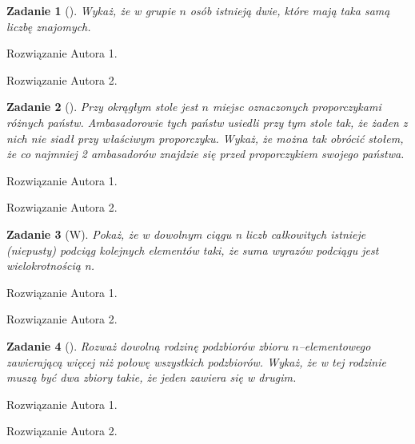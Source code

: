 \documentclass{mwart}
\newtheorem{zad}{Zadanie}[section]
\begin{document}
\begin{zad}[]
    Wykaż, że w grupie $n$ osób istnieją dwie, które mają taka samą liczbę znajomych.
\end{zad}
\begin{mdframed}
    Rozwiązanie Autora 1.
\end{mdframed}
\begin{mdframed}
    Rozwiązanie Autora 2.
\end{mdframed}




\begin{zad}[]
    Przy okrągłym stole jest $n$ miejsc oznaczonych proporczykami różnych
    państw. Ambasadorowie tych państw usiedli przy tym stole tak, że żaden z nich nie siadł
    przy właściwym proporczyku. Wykaż, że można tak obrócić stołem, że co najmniej 2
    ambasadorów znajdzie się przed proporczykiem swojego państwa.
\end{zad}
\begin{mdframed}
    Rozwiązanie Autora 1.
\end{mdframed}
\begin{mdframed}
    Rozwiązanie Autora 2.
\end{mdframed}




\begin{zad}[W]
    Pokaż, że w dowolnym ciągu n liczb całkowitych istnieje (niepusty)
    podciąg kolejnych elementów taki, że suma wyrazów podciągu jest wielokrotnością n.
\end{zad}
\begin{mdframed}
    Rozwiązanie Autora 1.
\end{mdframed}
\begin{mdframed}
    Rozwiązanie Autora 2.
\end{mdframed}




\begin{zad}[]
    Rozważ dowolną rodzinę podzbiorów zbioru $n$--elementowego zawierającą
    więcej niż połowę wszystkich podzbiorów. Wykaż, że w tej rodzinie muszą być dwa zbiory
    takie, że jeden zawiera się w drugim.
\end{zad}
\begin{mdframed}
    Rozwiązanie Autora 1.
\end{mdframed}
\begin{mdframed}
    Rozwiązanie Autora 2.
\end{mdframed}
\end{document}
